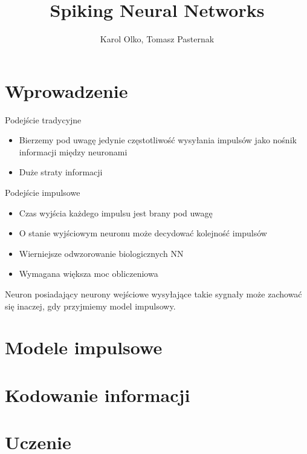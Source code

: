 \documentclass{beamer}
\author {Karol Olko, Tomasz Pasternak}
\title {Spiking Neural Networks}
\begin{document}
\frame{\titlepage}
\frame{\tableofcontents}
\section{Wprowadzenie}

\begin{frame}
  \begin{block}{Podejście tradycyjne}
    \begin{itemize}
    \item Bierzemy pod uwagę jedynie częstotliwość wysyłania impulsów jako nośnik informacji między neuronami
    \item Duże straty informacji
    \end{itemize}
  \end{block}
\end{frame}
\begin{frame}
  \begin{block}{Podejście impulsowe}
    \begin{itemize}
    \item<1-> Czas wyjścia każdego impulsu jest brany pod uwagę
    \item<2-> O stanie wyjściowym neuronu może decydować kolejność impulsów
    \item<3-> Wierniejsze odwzorowanie biologicznych NN
    \item<4-> Wymagana większa moc obliczeniowa
      \end{itemize}
  \end{block}
\end{frame}
\begin{frame}
  \begin{center}
  \end{center}
  Neuron posiadający neurony wejściowe wysyłające takie sygnały może zachować się inaczej, gdy przyjmiemy model impulsowy.
\end{frame}
\section{Modele impulsowe}
\section{Kodowanie informacji}
\section{Uczenie}
\end{document}

